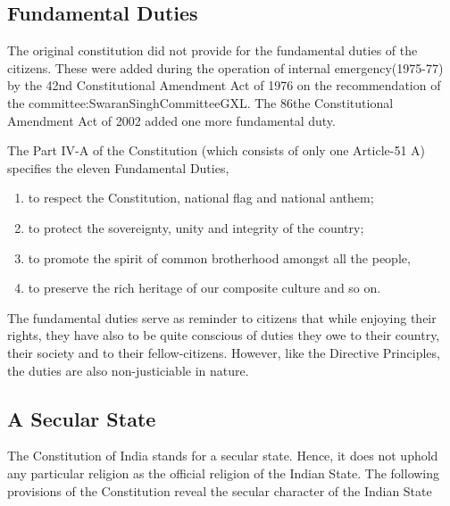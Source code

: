 \subsection{Fundamental Duties}

The original constitution did not provide for the fundamental duties of the citizens. These were added during the operation of internal emergency(1975-77) by the 42nd Constitutional Amendment Act of 1976 on the recommendation of the \gls{committee:SwaranSinghCommitteeGXL}. The 86the Constitutional Amendment Act of 2002 added one more fundamental duty.

The Part IV-A of the Constitution (which consists of only one Article-51 A) specifies the eleven Fundamental Duties,

\renewcommand{\labelenumi}{\textbf{(\alph{enumi})}}
\begin{enumerate}
  \item to respect the Constitution, national flag and national anthem;
  \item to protect the sovereignty, unity and integrity of the country;
  \item to promote the spirit of common brotherhood amongst all the people,
  \item to preserve the rich heritage of our composite culture and so on.
\end{enumerate}

The fundamental duties serve as reminder to citizens that while enjoying their rights, they have also to be quite conscious of duties they owe to their country, their society and to their fellow-citizens. However, like the Directive Principles, the duties are also non-justiciable in nature.


\subsection{A Secular State}

The Constitution of India stands for a secular state. Hence, it does not uphold any particular religion as the official religion of the Indian State. The following provisions of the Constitution reveal the secular character of the Indian State

